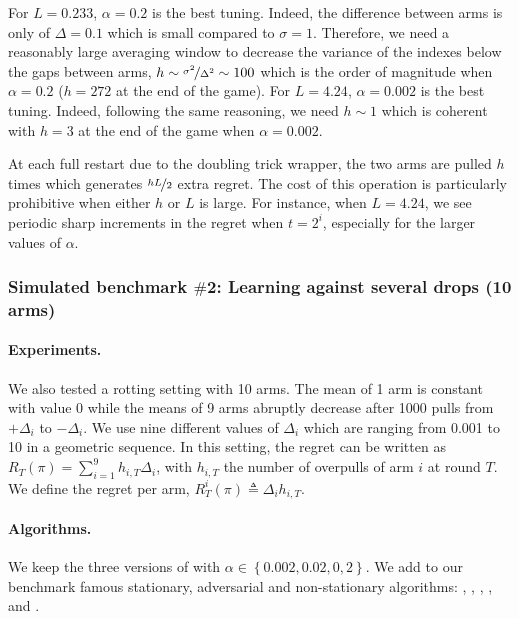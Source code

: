 For $L=0.233$, $\alpha= 0.2$ is the best tuning. Indeed, the difference between arms is only of $\Delta = 0.1$ which is small compared to $\sigma =1$. Therefore, we need a reasonably large averaging window to decrease the variance of the indexes below the gaps between arms, \ie $h \sim \nicefrac{\sigma^2}{\Delta^2} \sim 100$ which is the order of magnitude when $\alpha = 0.2$ ($h=272$ at the end of the game). For $L = 4.24$, $\alpha=0.002$ is the best tuning. Indeed, following the same reasoning, we need $h \sim 1$ which is coherent with $h=3$ at the end of the game when $\alpha = 0.002$.

At each full restart due to the doubling trick wrapper, the two arms are pulled $h$ times which generates $\nicefrac{hL}{2}$ extra regret. The cost of this operation is particularly prohibitive when either $h$ or $L$ is large. For instance, when $L=4.24$, we see periodic sharp increments in the regret when $t=2^i$, especially for the larger values of $\alpha$.


\subsubsection{Simulated benchmark $\#$2: Learning against several drops (10 arms)}
\paragraph{Experiments.} We also tested a rotting setting with 10 arms. The mean of 1 arm is constant with value 0 while the means of 9 arms abruptly decrease after 1000 pulls from $+\Delta_i$ to $-\Delta_i$. We use nine different values of $\Delta_i$ which are ranging from 0.001 to 10 in a geometric sequence. In this setting, the regret can be written as $R_T(\pi) = \sum_{i=1}^9 h_{i,T}\Delta_i$, with $h_{i,T}$ the number of overpulls of arm $i$ at round $T$. We define the regret per arm, $R_T^i(\pi) \triangleq \Delta_i h_{i,T}$.

\paragraph{Algorithms.} We keep the three versions of \wSWA with $\alpha \in \left\{ 0.002, 0.02, 0,2\right\}$. We add to our benchmark famous stationary, adversarial and non-stationary algorithms: \UCB \citep{lai1985asymptotically}, \EXP, \EXPS \citep{auer2002nonstochastic}, \DUCB, \SWUCB \citep{garivier2011upper-confidence-bound} and \GLRUCB \citep{besson2019generalized}. 

